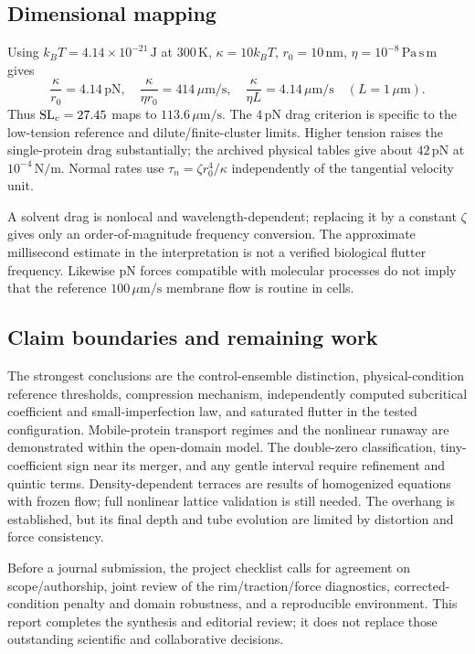 \subsection{Dimensional mapping}
Using $k_BT=4.14\times10^{-21}\,\mathrm J$ at $300\,\mathrm K$, $\kappa=10k_BT$, $r_0=10\,\mathrm{nm}$, $\eta=10^{-8}\,\mathrm{Pa\,s\,m}$ gives
\begin{equation}
\frac{\kappa}{r_0}=4.14\,\mathrm{pN},\quad
\frac{\kappa}{\eta r_0}=414\,\mu\mathrm{m/s},\quad
\frac{\kappa}{\eta L}=4.14\,\mu\mathrm{m/s}\quad(L=1\,\mu\mathrm m).
\end{equation}
Thus $\mathrm{SL}_c=27.45$ maps to $113.6\,\mu\mathrm{m/s}$. The $4\,\mathrm{pN}$ drag criterion is specific to the low-tension reference and dilute/finite-cluster limits. Higher tension raises the single-protein drag substantially; the archived physical tables give about $42\,\mathrm{pN}$ at $10^{-4}\,\mathrm{N/m}$. Normal rates use $\tau_n=\zeta r_0^4/\kappa$ independently of the tangential velocity unit.

A solvent drag is nonlocal and wavelength-dependent; replacing it by a constant $\zeta$ gives only an order-of-magnitude frequency conversion. The approximate millisecond estimate in the interpretation is not a verified biological flutter frequency. Likewise pN forces compatible with molecular processes do not imply that the reference $100\,\mu\mathrm{m/s}$ membrane flow is routine in cells.

\subsection{Claim boundaries and remaining work}
The strongest conclusions are the control-ensemble distinction, physical-condition reference thresholds, compression mechanism, independently computed subcritical coefficient and small-imperfection law, and saturated flutter in the tested configuration. Mobile-protein transport regimes and the nonlinear runaway are demonstrated within the open-domain model. The double-zero classification, tiny-coefficient sign near its merger, and any gentle interval require refinement and quintic terms. Density-dependent terraces are results of homogenized equations with frozen flow; full nonlinear lattice validation is still needed. The overhang is established, but its final depth and tube evolution are limited by distortion and force consistency.

Before a journal submission, the project checklist calls for agreement on scope/authorship, joint review of the rim/traction/force diagnostics, corrected-condition penalty and domain robustness, and a reproducible environment. This report completes the synthesis and editorial review; it does not replace those outstanding scientific and collaborative decisions.

